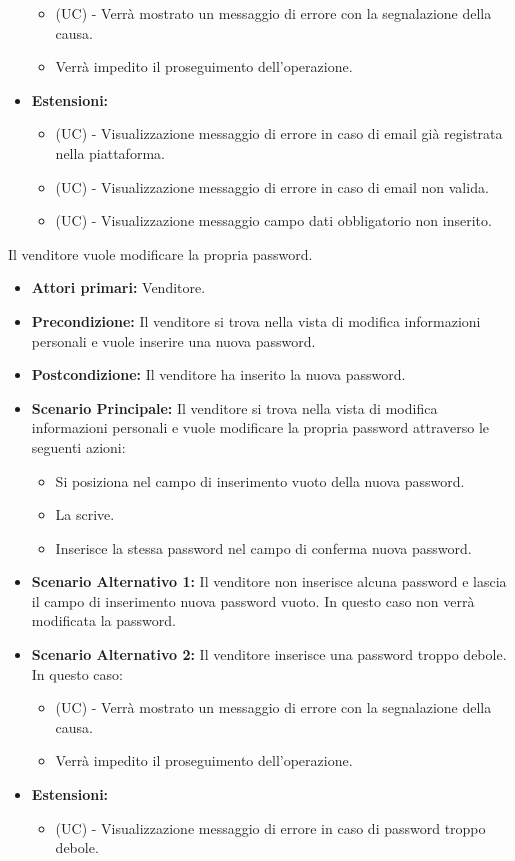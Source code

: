 \begin{itemize}
\begin{itemize}
        \item (UC) - Verrà mostrato un messaggio di errore con la segnalazione della causa.
        \item Verrà impedito il proseguimento dell'operazione.
    \end{itemize}
    \item \textbf{Estensioni:}
    \begin{itemize}
        \item (UC) - Visualizzazione messaggio di errore in caso di email già registrata nella piattaforma.
        \item (UC) - Visualizzazione messaggio di errore in caso di email non valida.
        \item (UC) - Visualizzazione messaggio campo dati obbligatorio non inserito.
    \end{itemize}
\end{itemize}

Il venditore vuole modificare la propria password.
\begin{itemize}
    \item \textbf{Attori primari:} Venditore.
    \item \textbf{Precondizione:} Il venditore si trova nella vista di modifica informazioni personali e vuole inserire una nuova password.
    \item \textbf{Postcondizione:} Il venditore ha inserito la nuova password.
    \item \textbf{Scenario Principale:} Il venditore si trova nella vista di modifica informazioni personali e vuole modificare la propria password attraverso le seguenti azioni:
        \begin{itemize}
            \item Si posiziona nel campo di inserimento vuoto della nuova password.
            \item La scrive.
            \item Inserisce la stessa password nel campo di conferma nuova password.
        \end{itemize}
    \item \textbf{Scenario Alternativo 1:} Il venditore non inserisce alcuna password e lascia il campo di inserimento nuova password vuoto. In questo caso non verrà modificata la password.
    \item \textbf{Scenario Alternativo 2:} Il venditore inserisce una password troppo debole. In questo caso:
    \begin{itemize}
        \item (UC) - Verrà mostrato un messaggio di errore con la segnalazione della causa.
        \item Verrà impedito il proseguimento dell'operazione.
    \end{itemize}
    \item \textbf{Estensioni:}
    \begin{itemize}
        \item (UC) - Visualizzazione messaggio di errore in caso di password troppo debole.
    \end{itemize}
\end{itemize}

